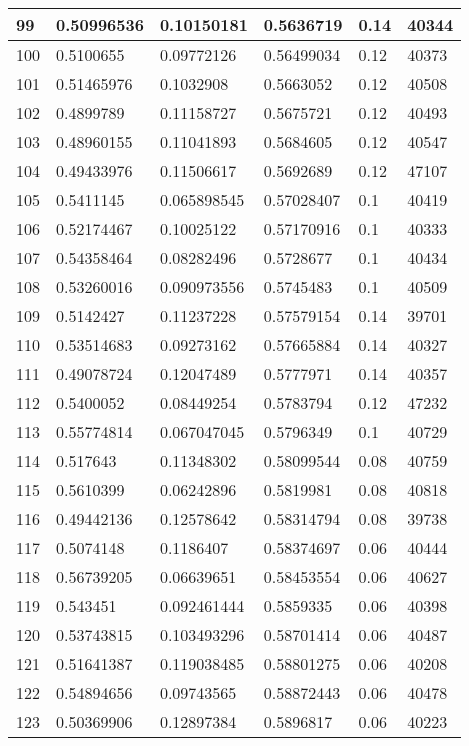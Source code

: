 \begin{longtable}{|l|l|l|l|l|l|}
99 & 0.50996536 & 0.10150181 & 0.5636719 & 0.14 & 40344 \\ \hline 
100 & 0.5100655 & 0.09772126 & 0.56499034 & 0.12 & 40373 \\ \hline 
101 & 0.51465976 & 0.1032908 & 0.5663052 & 0.12 & 40508 \\ \hline 
102 & 0.4899789 & 0.11158727 & 0.5675721 & 0.12 & 40493 \\ \hline 
103 & 0.48960155 & 0.11041893 & 0.5684605 & 0.12 & 40547 \\ \hline 
104 & 0.49433976 & 0.11506617 & 0.5692689 & 0.12 & 47107 \\ \hline 
105 & 0.5411145 & 0.065898545 & 0.57028407 & 0.1 & 40419 \\ \hline 
106 & 0.52174467 & 0.10025122 & 0.57170916 & 0.1 & 40333 \\ \hline 
107 & 0.54358464 & 0.08282496 & 0.5728677 & 0.1 & 40434 \\ \hline 
108 & 0.53260016 & 0.090973556 & 0.5745483 & 0.1 & 40509 \\ \hline 
109 & 0.5142427 & 0.11237228 & 0.57579154 & 0.14 & 39701 \\ \hline 
110 & 0.53514683 & 0.09273162 & 0.57665884 & 0.14 & 40327 \\ \hline 
111 & 0.49078724 & 0.12047489 & 0.5777971 & 0.14 & 40357 \\ \hline 
112 & 0.5400052 & 0.08449254 & 0.5783794 & 0.12 & 47232 \\ \hline 
113 & 0.55774814 & 0.067047045 & 0.5796349 & 0.1 & 40729 \\ \hline 
114 & 0.517643 & 0.11348302 & 0.58099544 & 0.08 & 40759 \\ \hline 
115 & 0.5610399 & 0.06242896 & 0.5819981 & 0.08 & 40818 \\ \hline 
116 & 0.49442136 & 0.12578642 & 0.58314794 & 0.08 & 39738 \\ \hline 
117 & 0.5074148 & 0.1186407 & 0.58374697 & 0.06 & 40444 \\ \hline 
118 & 0.56739205 & 0.06639651 & 0.58453554 & 0.06 & 40627 \\ \hline 
119 & 0.543451 & 0.092461444 & 0.5859335 & 0.06 & 40398 \\ \hline 
120 & 0.53743815 & 0.103493296 & 0.58701414 & 0.06 & 40487 \\ \hline 
121 & 0.51641387 & 0.119038485 & 0.58801275 & 0.06 & 40208 \\ \hline 
122 & 0.54894656 & 0.09743565 & 0.58872443 & 0.06 & 40478 \\ \hline 
123 & 0.50369906 & 0.12897384 & 0.5896817 & 0.06 & 40223 \\ \hline 

\end{longtable}
